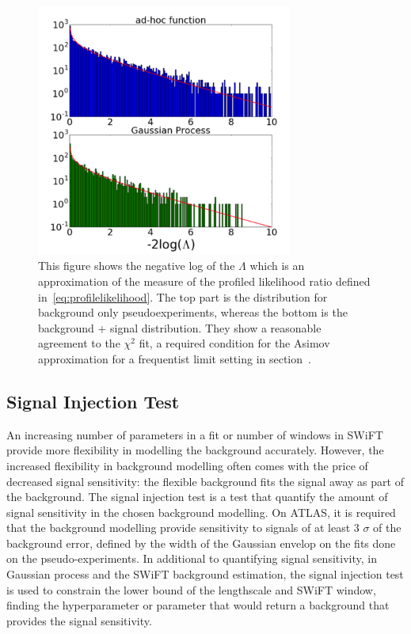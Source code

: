     \begin{figure}[!htb]
        \begin{center}
            \includegraphics[width=0.75\textwidth]{figures/chapter_analysismethod/chi2}
                \caption{
                This figure shows the negative log of the $\Lambda$ which is an approximation of the measure of the profiled likelihood ratio defined in~\ref{eq:profilelikelihood}. The top part is the distribution for background only pseudoexperiments, whereas the bottom is the background + signal distribution. They show a reasonable agreement to the $\chi^{2}$ fit, a required condition for the Asimov approximation for a frequentist limit setting in
            section~\cite{frate2017modelling}. }
            \label{fig:chi2}
        \end{center}
    \end{figure}
    \FloatBarrier

\subsection{Signal Injection Test}
    \label{sec:signalInjection}
    An increasing number of parameters in a fit or number of windows in SWiFT provide more flexibility in modelling the background accurately. However, the increased flexibility in background modelling often comes with the price of decreased signal sensitivity: the flexible background fits the signal away as part of the background. The signal injection test is a test that quantify the amount of signal sensitivity in the chosen background modelling. On ATLAS, it is required that the background modelling provide sensitivity to signals of at least 3 $\sigma$ of the background error, defined by the width of the Gaussian envelop on the fits done on the pseudo-experiments. In additional to quantifying signal sensitivity, in Gaussian process and the SWiFT background estimation, the signal injection test is used to constrain the lower bound of the lengthscale and SWiFT window, finding the hyperparameter or parameter that would return a background that provides the signal sensitivity. 

